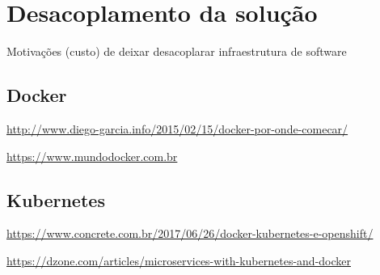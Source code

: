 \chapter{Desacoplamento da solução}

Motivações (custo) de deixar desacoplarar infraestrutura de software

\section{Docker}

\url{http://www.diego-garcia.info/2015/02/15/docker-por-onde-comecar/}

\url{https://www.mundodocker.com.br}

\section{Kubernetes}

\url{https://www.concrete.com.br/2017/06/26/docker-kubernetes-e-openshift/}

\url{https://dzone.com/articles/microservices-with-kubernetes-and-docker}
